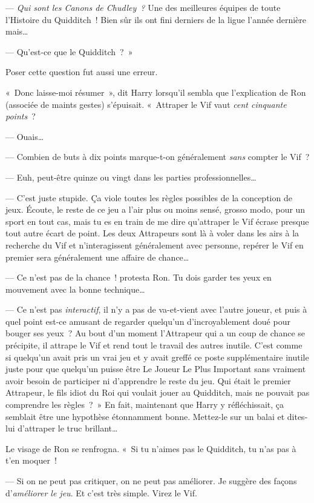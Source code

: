 --- \emph{Qui sont les Canons de Chudley~?} Une des meilleures équipes de toute l'Histoire du Quidditch~! Bien sûr ils ont fini derniers de la ligue l'année dernière mais…

--- Qu'est-ce que le Quidditch~?~»

Poser cette question fut aussi une erreur.

«~Donc laisse-moi résumer~», dit Harry lorsqu'il sembla que l'explication de Ron (associée de maints gestes) s'épuisait. «~Attraper le Vif vaut \emph{cent cinquante points}~?

--- Ouais…

--- Combien de buts à dix points marque-t-on généralement \emph{sans} compter le Vif~?

--- Euh, peut-être quinze ou vingt dans les parties professionnelles…

--- C'est juste stupide. Ça viole toutes les règles possibles de la conception de jeux. Écoute, le reste de ce jeu a l'air plus ou moins sensé, grosso modo, pour un sport en tout cas, mais tu es en train de me dire qu'attraper le Vif écrase presque tout autre écart de point. Les deux Attrapeurs sont là à voler dans les airs à la recherche du Vif et n'interagissent généralement avec personne, repérer le Vif en premier sera généralement une affaire de chance…

--- Ce n'est pas de la chance~! protesta Ron. Tu dois garder tes yeux en mouvement avec la bonne technique…

--- Ce n'est pas \emph{interactif}, il n'y a pas de va-et-vient avec l'autre joueur, et puis à quel point est-ce amusant de regarder quelqu'un d'incroyablement doué pour bouger ses yeux~? Au bout d'un moment l'Attrapeur qui a un coup de chance se précipite, il attrape le Vif et rend tout le travail des autres inutile. C'est comme si quelqu'un avait pris un vrai jeu et y avait greffé ce poste supplémentaire inutile juste pour que quelqu'un puisse être Le Joueur Le Plus Important sans vraiment avoir besoin de participer ni d'apprendre le reste du jeu. Qui était le premier Attrapeur, le fils idiot du Roi qui voulait jouer au Quidditch, mais ne pouvait pas comprendre les règles~?~» En fait, maintenant que Harry y réfléchissait, ça semblait être une hypothèse étonnamment bonne. Mettez-le sur un balai et dites-lui d'attraper le truc brillant…

Le visage de Ron se renfrogna.
«~Si tu n'aimes pas le Quidditch, tu n'as pas à t'en moquer~!

--- Si on ne peut pas critiquer, on ne peut pas améliorer. Je suggère des façons d'\emph{améliorer le jeu}. Et c'est très simple. Virez le Vif.


